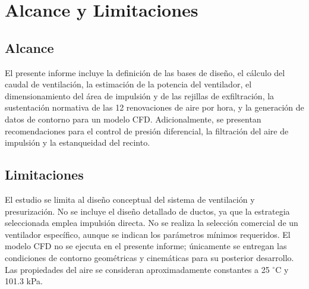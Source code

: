 \section{Alcance y Limitaciones}

\subsection{Alcance}

El presente informe incluye la definición de las bases de diseño, el cálculo del caudal de ventilación, la estimación de la potencia del ventilador, el dimensionamiento del área de impulsión y de las rejillas de exfiltración, la sustentación normativa de las 12 renovaciones de aire por hora, y la generación de datos de contorno para un modelo CFD. Adicionalmente, se presentan recomendaciones para el control de presión diferencial, la filtración del aire de impulsión y la estanqueidad del recinto.

\subsection{Limitaciones}

El estudio se limita al diseño conceptual del sistema de ventilación y presurización. No se incluye el diseño detallado de ductos, ya que la estrategia seleccionada emplea impulsión directa. No se realiza la selección comercial de un ventilador específico, aunque se indican los parámetros mínimos requeridos. El modelo CFD no se ejecuta en el presente informe; únicamente se entregan las condiciones de contorno geométricas y cinemáticas para su posterior desarrollo. Las propiedades del aire se consideran aproximadamente constantes a 25 $^{\circ}$C y 101.3 kPa.

